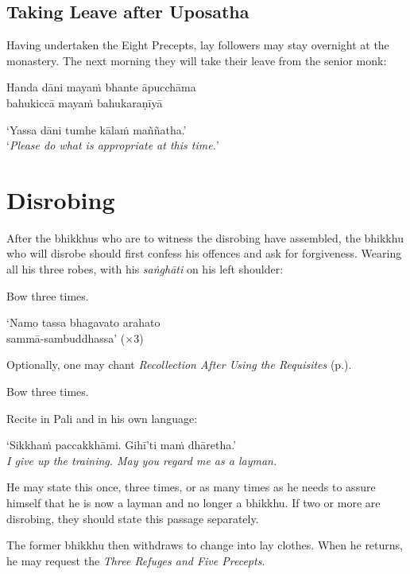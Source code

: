 \subsection{Taking Leave after Uposatha}

Having undertaken the Eight Precepts, lay followers may stay overnight at the monastery. The next
morning they will take their leave from the senior monk:


Handa dāni mayaṁ bhante āpucchāma\\
bahukiccā mayaṁ bahukaraṇīyā


‘Yassa dāni tumhe kālaṁ maññatha.’\\
‘\emph{Please do what is appropriate at this time.}’

\section{Disrobing}

After the bhikkhus who are to witness the disrobing have assembled, the bhikkhu
who will disrobe should first confess his offences and ask for forgiveness. Wearing all his three
robes, with his \emph{saṅghāti} on his left shoulder:

Bow three times.

‘Namo tassa bhagavato arahato\\
sammā-sambuddhassa’ (×3)

Optionally, one may chant \emph{Recollection After Using the Requisites}
(p.\pageref{recollection-after-using}).

Bow three times.

Recite in Pali and in his own language:

‘Sikkhaṁ paccakkhāmi. Gihī'ti maṁ dhāretha.’\\
\emph{I give up the training. May you regard me as a layman.}

He may state this once, three times, or as many times as he needs to assure
himself that he is now a layman and no longer a bhikkhu. If two or more are
disrobing, they should state this passage separately.

The former bhikkhu then withdraws to change into lay clothes. When he returns,
he may request the \emph{Three Refuges and Five Precepts}.

